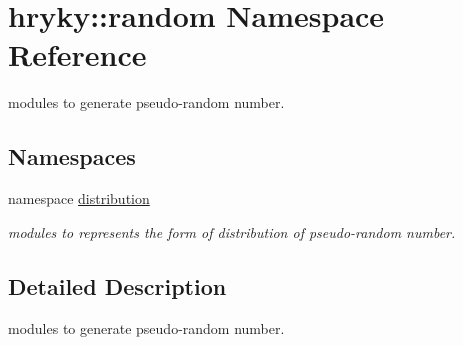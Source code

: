 \hypertarget{namespacehryky_1_1random}{\section{hryky\-:\-:random Namespace Reference}
\label{namespacehryky_1_1random}
}


modules to generate pseudo-\/random number.  


\subsection*{Namespaces}
\begin{DoxyCompactItemize}
\item 
namespace \hyperlink{namespacehryky_1_1random_1_1distribution}{distribution}
\begin{DoxyCompactList}\small\item\em modules to represents the form of distribution of pseudo-\/random number. \end{DoxyCompactList}\end{DoxyCompactItemize}


\subsection{Detailed Description}
modules to generate pseudo-\/random number. 